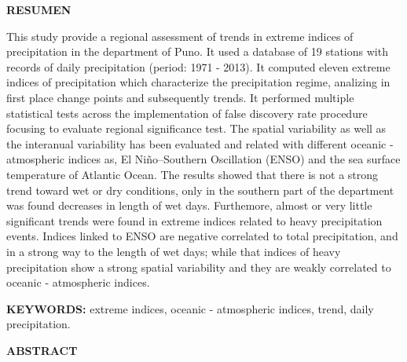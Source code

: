 \begin{center}
\vspace*{1cm}
\large{\textbf {RESUMEN}}
\vspace*{1cm}
\end{center}


This study provide a regional assessment of trends in extreme indices of precipitation in the department of Puno. It used a database of 19 stations with records of daily precipitation (period: 1971 - 2013). It computed eleven extreme indices of precipitation which characterize the precipitation regime, analizing in first place change points and subsequently trends. It performed multiple statistical tests across the implementation of false discovery rate procedure focusing to evaluate regional significance test. The spatial variability as well as the interanual variability has been evaluated and related with different oceanic - atmospheric indices as, El Niño–Southern Oscillation (ENSO) and the sea surface temperature of Atlantic Ocean. The results showed that there is not a strong trend toward wet or dry conditions, only in the southern part of the department was found decreases in length of wet days. Furthemore, almost or very little significant trends were found in extreme indices related to heavy precipitation events. Indices linked to ENSO are negative correlated to total precipitation, and in a strong way to the length of wet days; while that indices of heavy precipitation show a strong spatial variability and they are weakly correlated to oceanic - atmospheric indices.

\vspace*{3cm}

\textbf {KEYWORDS:} extreme indices, oceanic - atmospheric indices, trend, daily precipitation.

\clearpage

\begin{center}
	\vspace*{1cm}
	\large{\textbf {ABSTRACT}}
	\vspace*{1cm}
\end{center}


